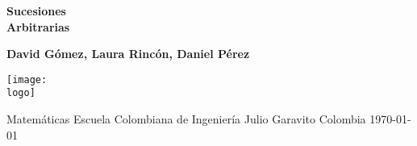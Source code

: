 \documentclass{article}
\newcommand{\logo}{"C:/Users/usuario/OneDrive/Documentos/U/logo-eci.png"}
\newcommand{\titlename}{Sucesiones \\[10pt] Arbitrarias}%
\renewcommand{\author}{{David Gómez, Laura Rincón, Daniel Pérez}}
\begin{document}
\begin{titlepage}
    \begin{center}
        \vspace*{1cm}

        \textbf{\Huge{\titlename}}

        \vspace{1.5cm}

        \textbf{\Large{\author}}

        \vspace{3cm}

        \texttt{[image: \\logo]}

        \vfill

        Matemáticas\linebreak
        Escuela Colombiana de Ingeniería Julio Garavito\linebreak
        Colombia\linebreak
        \today

    \end{center}
\end{titlepage}

\clearpage
\tableofcontents
\clearpage










\end{document}
